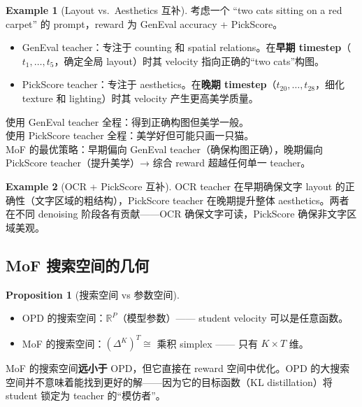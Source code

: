 \documentclass[11pt,a4paper]{article}
\newcommand{\R}{\mathbb{R}}
\theoremstyle{definition}
\newtheorem{proposition}{Proposition}
\newtheorem{example}{Example}
\begin{document}
\begin{example}[Layout vs.\ Aesthetics 互补]
考虑一个 ``two cats sitting on a red carpet'' 的 prompt，reward 为 GenEval accuracy + PickScore。

\begin{itemize}
\item GenEval teacher：专注于 counting 和 spatial relations。在\textbf{早期 timestep}（$t_1, \ldots, t_5$，确定全局 layout）时其 velocity 指向正确的``two cats''构图。
\item PickScore teacher：专注于 aesthetics。在\textbf{晚期 timestep}（$t_{20}, \ldots, t_{28}$，细化 texture 和 lighting）时其 velocity 产生更高美学质量。
\end{itemize}

使用 GenEval teacher 全程：得到正确构图但美学一般。\\
使用 PickScore teacher 全程：美学好但可能只画一只猫。\\
MoF 的最优策略：早期偏向 GenEval teacher（确保构图正确），晚期偏向 PickScore teacher（提升美学）→ 综合 reward 超越任何单一 teacher。
\end{example}

\begin{example}[OCR + PickScore 互补]
OCR teacher 在早期确保文字 layout 的正确性（文字区域的粗结构），PickScore teacher 在晚期提升整体 aesthetics。两者在不同 denoising 阶段各有贡献——OCR 确保文字可读，PickScore 确保非文字区域美观。
\end{example}

\subsection{MoF 搜索空间的几何}

\begin{proposition}[搜索空间 vs 参数空间]
\begin{itemize}
\item OPD 的搜索空间：$\R^P$（模型参数）—— student velocity 可以是任意函数。
\item MoF 的搜索空间：$(\Delta^K)^T \cong$ 乘积 simplex —— 只有 $K \times T$ 维。
\end{itemize}

MoF 的搜索空间\textbf{远小于} OPD，但它直接在 reward 空间中优化。OPD 的大搜索空间并不意味着能找到更好的解——因为它的目标函数（KL distillation）将 student 锁定为 teacher 的``模仿者''。
\end{proposition}

\end{document}
